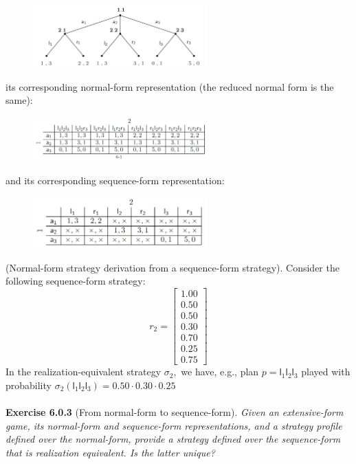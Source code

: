\begin{figure}[H]
\centering
\includegraphics[width=0.6\textwidth]{images/img_1_6_01.png}
\end{figure}
\noindent
its corresponding normal-form representation (the reduced normal form is the same):
\begin{figure}[H]
\centering
\includegraphics[width=0.6\textwidth]{images/img_1_6_02.png}
\end{figure}
\noindent
and its corresponding sequence-form representation:
\begin{figure}[H]
\centering
\includegraphics[width=0.6\textwidth]{images/img_1_6_03.png}
\end{figure}
\noindent
(Normal-form strategy derivation from a sequence-form strategy). Consider the following sequence-form strategy:
$$ 
r_{2}=\left[\begin{array}{c}
1.00 \\
0.50 \\
0.50 \\
0.30 \\
0.70 \\
0.25 \\
0.75
\end{array}\right]
$$
In the realization-equivalent strategy $\sigma_{2},$ we have, e.g., plan $p=\mathsf{l}_{1}\mathsf{l}_{2}\mathsf{l}_{3}$ played with probability $\sigma_{2}\left(\mathsf{l}_{1}\mathsf{l}_{2}\mathsf{l}_{3}\right)=0.50 \cdot 0.30 \cdot 0.25$\\\\
\textbf{Exercise 6.0.3} (From normal-form to sequence-form). \textit{Given an extensive-form game, its normal-form and sequence-form representations, and a strategy profile defined over the normal-form, provide a strategy defined over the sequence-form that is realization equivalent. Is the latter unique?}\\\\
